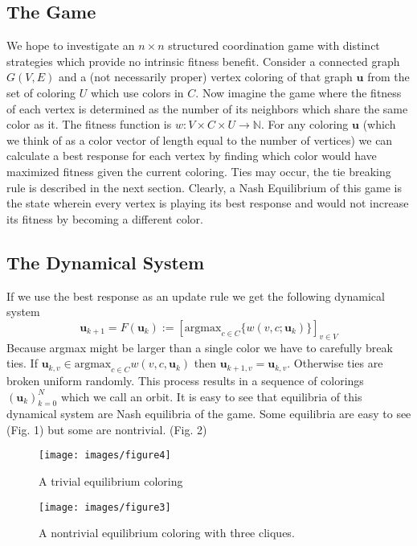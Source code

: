 \documentclass[]{article}
\begin{document}
\subsection{The Game}
We hope to investigate an $n\times n$ structured coordination game with distinct strategies which provide no intrinsic fitness benefit.
Consider a connected graph $G(V,E)$ and a (not necessarily proper) vertex coloring of that graph $\mathbf{u}$ from the set of coloring $U$ which use colors in $C$. Now imagine the game where the fitness of each vertex is determined as the number of its neighbors which share the same color as it. The fitness function is $w:V\times C\times U\rightarrow \mathbb{N}$.
For any coloring $\mathbf{u}$ (which we think of as a color vector of length equal to the number of vertices) we can calculate a best response for each vertex by finding which color would have maximized fitness given the current coloring. Ties may occur, the tie breaking rule is described in the next section. Clearly, a Nash Equilibrium of this game is the state wherein every vertex is playing its best response and would not increase its fitness by becoming a different color. 
\subsection{The Dynamical System}
If we use the best response as an update rule we get the following dynamical system
\begin{equation}
	\mathbf{u}_{k+1}=F(\mathbf{u}_k):=[\text{argmax}_{c\in C}\{w(v,c;\mathbf{u}_k)\} ]_{v\in V}
\end{equation}
Because argmax might be larger than a single color we have to carefully break ties. If $\mathbf{u}_{k,v}\in \text{argmax}_{c\in C}{w(v,c,\mathbf{u}_k)}$ then $\mathbf{u}_{k+1,v}=\mathbf{u}_{k,v}$. Otherwise ties are broken uniform randomly. This process results in a sequence of colorings $(\mathbf{u}_k)_{k=0}^N$ which we call an orbit. It is easy to see that equilibria of this dynamical system are Nash equilibria of the game. Some equilibria are easy to see (Fig. 1) but some are nontrivial. (Fig. 2)
\begin{figure}[h!]
	\texttt{[image: images/figure4]}
	\caption{A trivial equilibrium coloring}
\end{figure}
\begin{figure}
	\texttt{[image: images/figure3]}
	\caption{A nontrivial equilibrium coloring with three cliques.}
\end{figure}
\end{document}
